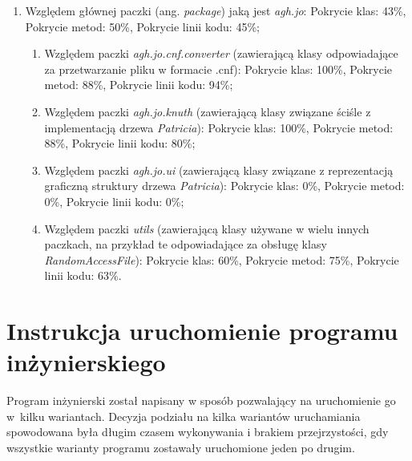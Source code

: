         \begin{enumerate}
            \item Względem głównej paczki (ang. \emph{package}) jaką jest \emph{agh.jo}:
                \subitem Pokrycie klas: 43\%,
                \subitem Pokrycie metod: 50\%,
                \subitem Pokrycie linii kodu: 45\%;
            \begin{enumerate}
                \item Względem paczki \emph{agh.jo.cnf.converter} (zawierającą klasy odpowiadające za przetwarzanie pliku w formacie .cnf):
                    \subitem Pokrycie klas: 100\%,
                    \subitem Pokrycie metod: 88\%,
                    \subitem Pokrycie linii kodu: 94\%;
                \item Względem paczki \emph{agh.jo.knuth} (zawierającą klasy związane ściśle z implementacją drzewa \emph{Patricia}):
                    \subitem Pokrycie klas: 100\%,
                    \subitem Pokrycie metod: 88\%,
                    \subitem Pokrycie linii kodu: 80\%;
                \item Względem paczki \emph{agh.jo.ui} (zawierającą klasy związane z reprezentacją graficzną struktury drzewa \emph{Patricia}):
                    \subitem Pokrycie klas: 0\%,
                    \subitem Pokrycie metod: 0\%,
                    \subitem Pokrycie linii kodu: 0\%;
                \item Względem paczki \emph{utils} (zawierającą klasy używane w wielu innych paczkach, na przykład te odpowiadające za obsługę klasy \emph{RandomAccessFile}):
                    \subitem Pokrycie klas: 60\%,
                    \subitem Pokrycie metod: 75\%,
                    \subitem Pokrycie linii kodu: 63\%.
            \end{enumerate}
        \end{enumerate}
	
    	\section{Instrukcja uruchomienie programu inżynierskiego}\label{sec:czescPraktycznaUruchamianieProgramu}
    	
    	Program inżynierski został napisany w sposób pozwalający na uruchomienie go w~kilku wariantach. Decyzja podziału na kilka wariantów uruchamiania spowodowana była długim czasem wykonywania i brakiem przejrzystości, gdy wszystkie warianty programu zostawały uruchomione jeden po drugim. 
    	
